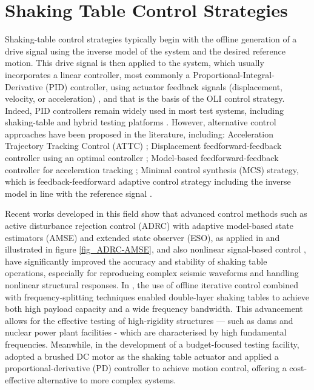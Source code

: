 \documentclass[  10pt, twoside]{report} %
\numberwithin{equation}{chapter}
\begin{document}
\section{Shaking Table Control Strategies}

Shaking-table control strategies typically begin with the offline generation of a drive signal using the inverse model of the system and the desired reference motion. This drive signal is then applied to the system, which usually incorporates a linear controller, most commonly a Proportional-Integral-Derivative (PID) controller, using actuator feedback signals (displacement, velocity, or acceleration) \citep{williams2001}, and that is the basis of the OLI control strategy. Indeed, PID controllers remain widely used in most test systems, including shaking-table and hybrid testing platforms \citep{tekeste2021}. However, alternative control approaches have been proposed in the literature, including: Acceleration Trajectory Tracking Control (ATTC) \citep{nakata2010}; Displacement feedforward-feedback controller using an optimal controller \citep{phillips2012}; Model-based feedforward-feedback controller for acceleration tracking \citep{phillips2014}; Minimal control synthesis (MCS) strategy, which is feedback-feedforward adaptive control strategy including the inverse model in line with the reference signal \citep{stoten2001}.


Recent works developed in this field show that advanced control methods such as active disturbance rejection control (ADRC) with adaptive model-based state estimators (AMSE) and extended state observer (ESO), as applied in \cite{Lei2023Disturbance} and illustrated in figure \ref{fig_ADRC-AMSE}, and also nonlinear signal-based control \citep{Enokida2019Nonlinear}, have significantly improved the accuracy and stability of shaking table operations, especially for reproducing complex seismic waveforms and handling nonlinear structural responses. In \cite{Tian2021Offline}, the use of offline iterative control combined with frequency-splitting techniques enabled double-layer shaking tables to achieve both high payload capacity and a wide frequency bandwidth. This advancement allows for the effective testing of high-rigidity structures — such as dams and nuclear power plant facilities - which are characterised by high fundamental frequencies.  Meanwhile, in the development of a budget-focused testing facility, \cite{Parajuli2024Development} adopted a brushed DC motor as the shaking table actuator and applied a proportional-derivative (PD) controller to achieve motion control, offering a cost-effective alternative to more complex systems.
\end{document}
